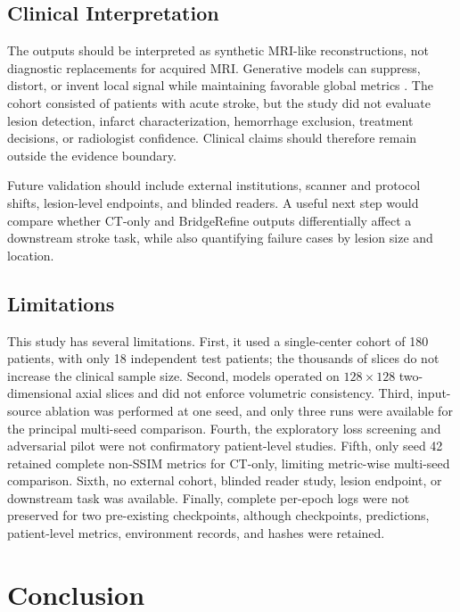\subsection{Clinical Interpretation}

The outputs should be interpreted as synthetic MRI-like reconstructions, not diagnostic replacements for acquired MRI. Generative models can suppress, distort, or invent local signal while maintaining favorable global metrics \cite{cohen2018hallucination}. The cohort consisted of patients with acute stroke, but the study did not evaluate lesion detection, infarct characterization, hemorrhage exclusion, treatment decisions, or radiologist confidence. Clinical claims should therefore remain outside the evidence boundary.

Future validation should include external institutions, scanner and protocol shifts, lesion-level endpoints, and blinded readers. A useful next step would compare whether CT-only and BridgeRefine outputs differentially affect a downstream stroke task, while also quantifying failure cases by lesion size and location.

\subsection{Limitations}

This study has several limitations. First, it used a single-center cohort of 180 patients, with only 18 independent test patients; the thousands of slices do not increase the clinical sample size. Second, models operated on $128\times128$ two-dimensional axial slices and did not enforce volumetric consistency. Third, input-source ablation was performed at one seed, and only three runs were available for the principal multi-seed comparison. Fourth, the exploratory loss screening and adversarial pilot were not confirmatory patient-level studies. Fifth, only seed 42 retained complete non-SSIM metrics for CT-only, limiting metric-wise multi-seed comparison. Sixth, no external cohort, blinded reader study, lesion endpoint, or downstream task was available. Finally, complete per-epoch logs were not preserved for two pre-existing checkpoints, although checkpoints, predictions, patient-level metrics, environment records, and hashes were retained.

\section{Conclusion}

